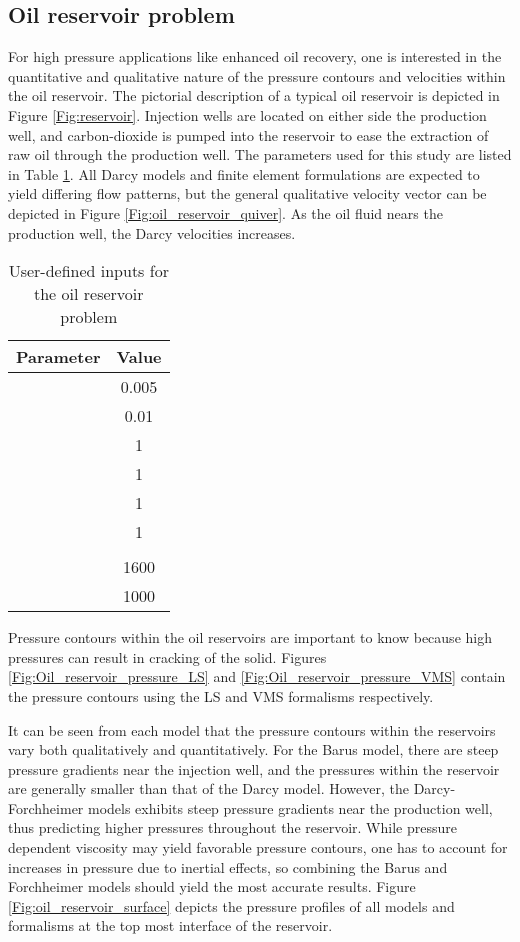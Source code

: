 \documentclass[11pt,reqno]{amsart}
\begin{document}
\subsection{Oil reservoir problem}
For high pressure applications like enhanced oil 
recovery, one is interested in the quantitative 
and qualitative nature of the pressure contours 
and velocities within the oil reservoir. The 
pictorial description of a typical oil reservoir 
is depicted in Figure \ref{Fig:reservoir}. Injection 
wells are located on either side the production well, 
and carbon-dioxide is pumped into the reservoir to 
ease the extraction of raw oil through the production 
well. The parameters used for this study are listed 
in Table \ref{Tab:oil_reservoir}. All Darcy models 
and finite element formulations are expected to yield 
differing flow patterns, but the general qualitative 
velocity vector can be depicted in Figure 
\ref{Fig:oil_reservoir_quiver}. As the oil fluid 
nears the production well, the Darcy velocities 
increases.
\begin{table}[h!]
  \centering
  \caption{User-defined inputs for the oil reservoir problem}
  \begin{tabular}{cc}
    \hline
    Parameter & Value \\ \hline
     & 0.005\\
     & 0.01\\	
     & 1\\
     & 1\\
     & 1 \\
     & 1 \\
     & \\
     & 1600\\
     & 1000\\
    \hline
  \end{tabular}
  \label{Tab:oil_reservoir}
\end{table}
Pressure contours within the oil reservoirs are important to know because high pressures can result 
in cracking of the solid. Figures \ref{Fig:Oil_reservoir_pressure_LS} and 
\ref{Fig:Oil_reservoir_pressure_VMS} contain the pressure contours using the LS and VMS formalisms respectively.

It can be seen from each model that the pressure contours within the reservoirs vary both qualitatively 
and quantitatively. For the Barus model, there are steep pressure gradients near the 
injection well, and the pressures within the reservoir are generally smaller than that of the Darcy 
model. However, the Darcy-Forchheimer models exhibits steep pressure gradients near the production 
well, thus predicting higher pressures throughout the reservoir. While pressure dependent 
viscosity may yield favorable pressure contours, one has to account for increases in 
pressure due to inertial effects, so combining the Barus and Forchheimer models should 
yield the most accurate results. Figure \ref{Fig:oil_reservoir_surface} depicts the
pressure profiles of all models and formalisms at the top most interface of the reservoir.
\end{document}
